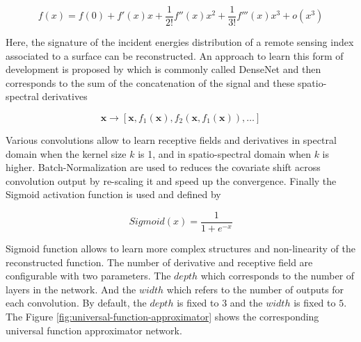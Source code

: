 \documentclass[../thesis.tex]{subfiles}
\begin{document}
	\begin{equation} f(x) = f(0) + f'(x) x + \frac{1}{2!} f''(x) x^2 + \frac{1}{3!} f'''(x) x^3 + o(x^3) \end{equation}
	
	Here, the signature of the incident energies distribution of a remote sensing index associated to a surface can be reconstructed. An approach to learn this form of development is proposed by \cite{DenseNet} which is commonly called DenseNet and then corresponds to the sum of the concatenation of the signal and these spatio-spectral derivatives
	
	\begin{equation} \mathbf{x} \to \left [\mathbf{x}, f_1(\mathbf{x}), f_2(\mathbf{x}, f_1(\mathbf{x})), \ldots\right] \end{equation}
	
	Various convolutions allow to learn receptive fields and derivatives in spectral domain when the kernel size $k$ is 1, and in spatio-spectral domain when $k$ is higher. Batch-Normalization are used to reduces the covariate shift across convolution output by re-scaling it and speed up the convergence. Finally the Sigmoid activation function is used and defined by
	
	\begin{equation} Sigmoid(x) = \frac{1}{1+e^{-x}} \end{equation}
	
	Sigmoid function allows to learn more complex structures and non-linearity of the reconstructed function. 
	The number of derivative and receptive field are configurable with two parameters. The $depth$ which corresponds to the number of layers in the network. And the $width$ which refers to the number of outputs for each convolution. By default, the $depth$ is fixed to $3$ and the $width$ is fixed to $5$. The Figure \ref{fig:universal-function-approximator} shows the corresponding universal function approximator network.
	
	
\end{document}
